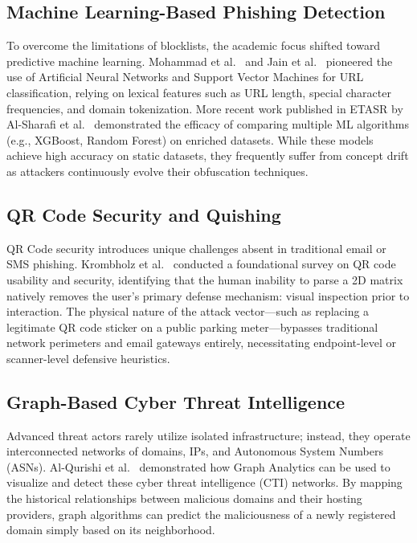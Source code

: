 \documentclass[10pt,twocolumn,letterpaper]{article}
\begin{document}
\subsection{Machine Learning-Based Phishing Detection}
To overcome the limitations of blocklists, the academic focus shifted toward predictive machine learning. Mohammad et al.~\cite{Mohammad2014} and Jain et al.~\cite{Jain2019} pioneered the use of Artificial Neural Networks and Support Vector Machines for URL classification, relying on lexical features such as URL length, special character frequencies, and domain tokenization. More recent work published in ETASR by Al-Sharafi et al.~\cite{AlSharafi2022} demonstrated the efficacy of comparing multiple ML algorithms (e.g., XGBoost, Random Forest) on enriched datasets. While these models achieve high accuracy on static datasets, they frequently suffer from concept drift as attackers continuously evolve their obfuscation techniques.

\subsection{QR Code Security and Quishing}
QR Code security introduces unique challenges absent in traditional email or SMS phishing. Krombholz et al.~\cite{Krombholz2014} conducted a foundational survey on QR code usability and security, identifying that the human inability to parse a 2D matrix natively removes the user's primary defense mechanism: visual inspection prior to interaction. The physical nature of the attack vector---such as replacing a legitimate QR code sticker on a public parking meter---bypasses traditional network perimeters and email gateways entirely, necessitating endpoint-level or scanner-level defensive heuristics.

\subsection{Graph-Based Cyber Threat Intelligence}
Advanced threat actors rarely utilize isolated infrastructure; instead, they operate interconnected networks of domains, IPs, and Autonomous System Numbers (ASNs). Al-Qurishi et al.~\cite{AlQurishi2018} demonstrated how Graph Analytics can be used to visualize and detect these cyber threat intelligence (CTI) networks. By mapping the historical relationships between malicious domains and their hosting providers, graph algorithms can predict the maliciousness of a newly registered domain simply based on its neighborhood.
\end{document}
